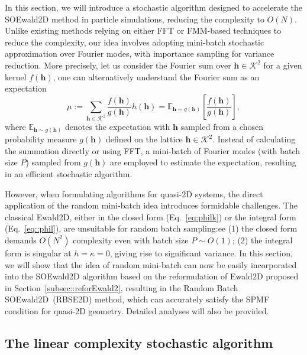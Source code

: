 In this section, we will introduce a stochastic algorithm designed to accelerate the SOEwald2D method in particle simulations, reducing the complexity to $O(N)$. 
Unlike existing methods relying on either FFT or FMM-based techniques to reduce the complexity, our idea involves adopting mini-batch stochastic approximation over Fourier modes, with importance sampling for variance reduction. 
More precisely, let us consider the Fourier sum over $\bm{h} \in \mathcal{K}^2$ for a given kernel $f(\bm{h})$,
one can alternatively understand the Fourier sum as an expectation
\begin{equation}
	\mu:=\sum_{\bm{h}\in\mathcal{K}^2}\frac{f(\bm{h})}{g(\bm{h})}h(\bm{h})=\mathbb{E}_{\bm h\sim g(\bm{h})}\left[\frac{f(\bm{h})}{g(\bm{h})}\right],
\end{equation}
where $\mathbb{E}_{\bm h \sim g(\bm{h})}$ denotes the expectation with $\bm{h}$ sampled from a chosen probability measure $g(\bm{h})$ defined on the lattice $\bm h \in \mathcal{K}^2$. 
Instead of calculating the summation directly or using FFT, a mini-batch of Fourier modes (with batch size $P$) sampled from $g(\bm{h})$ are employed to estimate the expectation, resulting in an efficient stochastic algorithm.

However, when formulating algorithms for quasi-2D systems, the direct application of the random mini-batch idea introduces formidable challenges.
The classical Ewald2D, either in the closed form (Eq.~\eqref{eq:philk}) or the integral form (Eq.~\eqref{eq::phil}), are unsuitable for random batch sampling:ee
(1) the closed form demands $O(N^2)$ complexity even with batch size $P \sim O(1)$; 
(2) the integral form is singular at $h = \kappa = 0$, giving rise to significant variance.
In this section, we will show that the idea of random mini-batch can now be easily incorporated into the SOEwald2D algorithm based on the reformulation of Ewald2D proposed in Section~\ref{subsec::reforEwald2}, resulting in the Random Batch SOEwald2D~(RBSE2D) method, which can accurately satisfy the SPMF condition for quasi-2D geometry.
Detailed analyses will also be provided.

\subsection{The linear complexity stochastic algorithm} \label{subsec::rbis}

